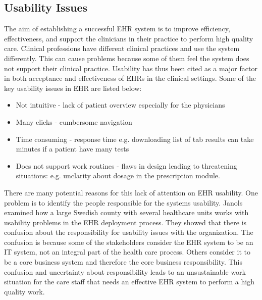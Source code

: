\documentclass[14pt]{article}
\begin{document}
\subsection{Usability Issues}
\label{sec:futureUsability}
The aim of establishing a successful \gls{EHR} system is to improve efficiency, effectiveness, and support the clinicians in their practice to perform high quality care. Clinical professions have different clinical practices and use the system differently. This can cause problems because some of them feel the system does not support their clinical practice. Usability has thus been cited as a major factor in both acceptance and effectiveness of \gls{EHR}s in the clinical settings. Some of the key usability issues in \gls{EHR} are listed below:
\begin{itemize}
\item Not intuitive - lack of patient overview especially for the physicians
\item Many clicks - cumbersome navigation
\item Time consuming - response time e.g. downloading list of tab results can take minutes if a patient have many tests
\item Does not support work routines - flaws in design leading to threatening situations:  e.g. unclarity about dosage in the  prescription module.
\end{itemize}

There are many potential reasons for this lack of attention on \gls{EHR} usability. One problem is to identify the people responsible for the systems usability. Janols \cite{Janols} examined how a large Swedish county with several healthcare units works with usability problems in the \gls{EHR} \cite{Janols} deployment process. They showed that there is confusion about the responsibility for usability issues with the organization. The confusion is because some of the stakeholders consider the \gls{EHR} system to be an IT system, not an integral part of the health care process. Others consider it to be a core business system and therefore the core business responsibility. This confusion and uncertainty about responsibility leads to an unsustainable work situation for the care staff that needs an effective \gls{EHR} system to perform a high quality work.
\end{document}
